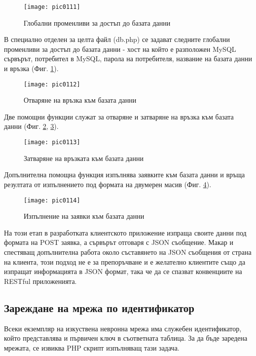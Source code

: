 \begin{figure}[h]
  \centering
  \texttt{[image: pic0111]}
  \caption{Глобални променливи за достъп до базата данни}
\label{fig:pic0111}
\end{figure}
\FloatBarrier

В специално отделен за целта файл (db.php) се задават следните глобални променливи за достъп до базата данни - хост на който е разположен MySQL сървърът, потребител в MySQL, парола на потребителя, название на базата данни и връзка (Фиг. \ref{fig:pic0111}).

\begin{figure}[h]
  \centering
  \texttt{[image: pic0112]}
  \caption{Отваряне на връзка към базата данни}
\label{fig:pic0112}
\end{figure}
\FloatBarrier

Две помощни функции служат за отваряне и затваряне на връзка към базата данни (Фиг. \ref{fig:pic0112}, \ref{fig:pic0113}).

\begin{figure}[h]
  \centering
  \texttt{[image: pic0113]}
  \caption{Затваряне на връзката към базата данни}
\label{fig:pic0113}
\end{figure}
\FloatBarrier

Допълнителна помощна функция изпълнява заявките към базата данни и връща резултата от изпълнението под формата на двумерен масив (Фиг. \ref{fig:pic0114}).

\begin{figure}[h]
  \centering
  \texttt{[image: pic0114]}
  \caption{Изпълнение на заявки към базата данни}
\label{fig:pic0114}
\end{figure}
\FloatBarrier

На този етап в разработката клиентското приложение изпраща своите данни под формата на POST заявка, а сървърът отговаря с JSON съобщение. Макар и спестяващ допълнителна работа около съставянето на JSON съобщения от страна на клиента, този подход не е за препоръчване и е желателно клиентите също да изпращат информацията в JSON формат, така че да се спазват конвенциите на RESTful приложенията. 

\subsection{Зареждане на мрежа по идентификатор}

Всеки екземпляр на изкуствена невронна мрежа има служебен идентификатор, който представлява и първичен ключ в съответната таблица. За да бъде заредена мрежата, се извиква PHP скрипт изпълняващ тази задача. 

